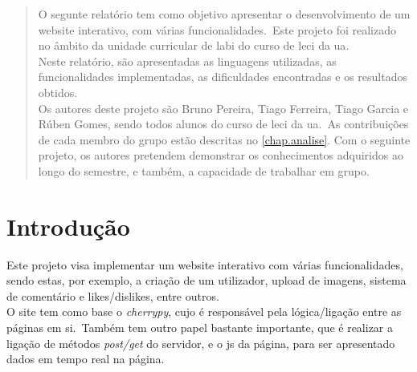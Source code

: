 \documentclass{report}
\begin{document}
\begin{abstract}
    O segunte relatório tem como objetivo apresentar o desenvolvimento de um website interativo, com várias funcionalidades.\ Este projeto foi realizado no âmbito da unidade curricular de \ac{labi} do curso de \ac{leci} da \ac{ua}.\\
    Neste relatório, são apresentadas as linguagens utilizadas, as funcionalidades implementadas, as dificuldades encontradas e os resultados obtidos.\\
    Os autores deste projeto são Bruno Pereira, Tiago Ferreira, Tiago Garcia e Rúben Gomes, sendo todos alunos do curso de \ac{leci} da \ac{ua}.\ As contribuições de cada membro do grupo estão descritas no \autoref{chap.analise}.
    Com o seguinte projeto, os autores pretendem demonstrar os conhecimentos adquiridos ao longo do semestre, e também, a capacidade de trabalhar em grupo.

\end{abstract}




\tableofcontents
\listoffigures    %


\clearpage
{}

\chapter{Introdução}
\label{chap.introducao}

Este projeto visa implementar um website interativo com várias funcionalidades, sendo estas, por exemplo, a criação de um utilizador, upload de imagens, sistema de comentário e likes/dislikes, entre outros. \\

O site tem como base o \textit{cherrypy}, cujo é responsável pela lógica/ligação entre as páginas em si.\ Também tem outro papel bastante importante, que é realizar a ligação de métodos \textit{post/get} do servidor, e o \ac{js} da página, para ser apresentado dados em tempo real na página.\\
\end{document}
